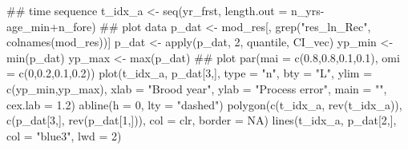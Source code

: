 \documentclass[11pt,]{article}
\newenvironment{Shaded}{}{}
\newcommand{\CommentTok}[1]{\textcolor[rgb]{0.00,0.50,0.00}{#1}}
\newcommand{\DataTypeTok}[1]{#1}
\newcommand{\DecValTok}[1]{#1}
\newcommand{\FloatTok}[1]{#1}
\newcommand{\KeywordTok}[1]{\textcolor[rgb]{0.00,0.00,1.00}{#1}}
\newcommand{\NormalTok}[1]{#1}
\newcommand{\OperatorTok}[1]{#1}
\newcommand{\OtherTok}[1]{\textcolor[rgb]{1.00,0.25,0.00}{#1}}
\newcommand{\StringTok}[1]{\textcolor[rgb]{0.00,0.50,0.50}{#1}}
\begin{document}
\begin{Shaded}
\begin{Highlighting}[]
\CommentTok{## time sequence}
\NormalTok{t_idx_a <-}\StringTok{ }\KeywordTok{seq}\NormalTok{(yr_frst, }\DataTypeTok{length.out =}\NormalTok{ n_yrs}\OperatorTok{-}\NormalTok{age_min}\OperatorTok{+}\NormalTok{n_fore)}
\CommentTok{## plot data}
\NormalTok{p_dat <-}\StringTok{ }\NormalTok{mod_res[, }\KeywordTok{grep}\NormalTok{(}\StringTok{"res_ln_Rec"}\NormalTok{, }\KeywordTok{colnames}\NormalTok{(mod_res))]}
\NormalTok{p_dat <-}\StringTok{ }\KeywordTok{apply}\NormalTok{(p_dat, }\DecValTok{2}\NormalTok{, quantile, CI_vec)}
\NormalTok{yp_min <-}\StringTok{ }\KeywordTok{min}\NormalTok{(p_dat)}
\NormalTok{yp_max <-}\StringTok{ }\KeywordTok{max}\NormalTok{(p_dat)}
\CommentTok{## plot}
\KeywordTok{par}\NormalTok{(}\DataTypeTok{mai =} \KeywordTok{c}\NormalTok{(}\FloatTok{0.8}\NormalTok{,}\FloatTok{0.8}\NormalTok{,}\FloatTok{0.1}\NormalTok{,}\FloatTok{0.1}\NormalTok{), }\DataTypeTok{omi =} \KeywordTok{c}\NormalTok{(}\DecValTok{0}\NormalTok{,}\FloatTok{0.2}\NormalTok{,}\FloatTok{0.1}\NormalTok{,}\FloatTok{0.2}\NormalTok{))}
\KeywordTok{plot}\NormalTok{(t_idx_a, p_dat[}\DecValTok{3}\NormalTok{,],}
     \DataTypeTok{type =} \StringTok{"n"}\NormalTok{,  }\DataTypeTok{bty =} \StringTok{"L"}\NormalTok{,}
     \DataTypeTok{ylim =} \KeywordTok{c}\NormalTok{(yp_min,yp_max),}
     \DataTypeTok{xlab =} \StringTok{"Brood year"}\NormalTok{, }\DataTypeTok{ylab =} \StringTok{"Process error"}\NormalTok{, }\DataTypeTok{main =} \StringTok{""}\NormalTok{,}
     \DataTypeTok{cex.lab =} \FloatTok{1.2}\NormalTok{)}
\KeywordTok{abline}\NormalTok{(}\DataTypeTok{h =} \DecValTok{0}\NormalTok{, }\DataTypeTok{lty =} \StringTok{"dashed"}\NormalTok{)}
\KeywordTok{polygon}\NormalTok{(}\KeywordTok{c}\NormalTok{(t_idx_a, }\KeywordTok{rev}\NormalTok{(t_idx_a)), }\KeywordTok{c}\NormalTok{(p_dat[}\DecValTok{3}\NormalTok{,], }\KeywordTok{rev}\NormalTok{(p_dat[}\DecValTok{1}\NormalTok{,])),}
        \DataTypeTok{col =}\NormalTok{ clr, }\DataTypeTok{border =} \OtherTok{NA}\NormalTok{)}
\KeywordTok{lines}\NormalTok{(t_idx_a, p_dat[}\DecValTok{2}\NormalTok{,], }\DataTypeTok{col =} \StringTok{"blue3"}\NormalTok{, }\DataTypeTok{lwd =} \DecValTok{2}\NormalTok{)}
\end{Highlighting}
\end{Shaded}
\end{document}
